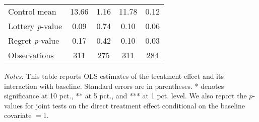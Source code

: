 \begin{table}[htbp]
{\begin{threeparttable}
\begin{tabular}{l*{4}{c}}
Control mean    &    13.66         &     1.16         &    11.78         &     0.12         \\
Lottery \emph{p}-value&     0.09         &     0.74         &     0.10         &     0.06         \\
Regret \emph{p}-value&     0.17         &     0.42         &     0.10         &     0.03         \\
Observations    &      311         &      275         &      311         &      284         \\
\bottomrule \end{tabular} \begin{tablenotes}[flushleft] \footnotesize \item \emph{Notes:} This table reports OLS estimates of the treatment effect and its interaction with baseline. Standard errors are in parentheses. * denotes significance at 10 pct., ** at 5 pct., and *** at 1 pct. level. We also report the \(p\)-values for joint tests on the direct treatment effect conditional on the baseline covariate $= 1$. \end{tablenotes} \end{threeparttable} } \end{table}

